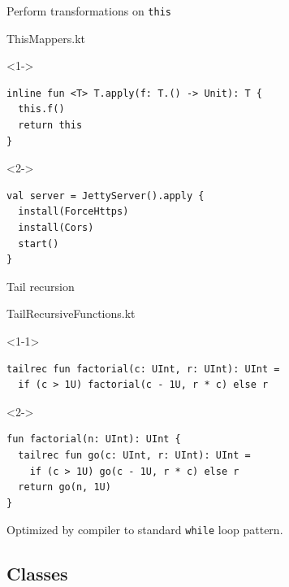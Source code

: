 \documentclass[hyperref={pdfpagelabels=false},xcolor={dvipsnames},compress]{beamer}
\begin{document}
    \begin{frame}[fragile]{Perform transformations on \texttt{this}}
        \begin{exampleblock}{ThisMappers.kt}
            \begin{onlyenv}<1->
                \begin{lstlisting}
inline fun <T> T.apply(f: T.() -> Unit): T {
  this.f()
  return this
}
                \end{lstlisting}
            \end{onlyenv}
            \begin{onlyenv}<2->
                \begin{lstlisting}
val server = JettyServer().apply {
  install(ForceHttps)
  install(Cors)
  start()
}
                \end{lstlisting}
            \end{onlyenv}
        \end{exampleblock}
    \end{frame}

    \begin{frame}[fragile]{Tail recursion}
        \begin{exampleblock}{TailRecursiveFunctions.kt}
            \begin{onlyenv}<1-1>
                \begin{lstlisting}
tailrec fun factorial(c: UInt, r: UInt): UInt =
  if (c > 1U) factorial(c - 1U, r * c) else r
                \end{lstlisting}
            \end{onlyenv}
            \begin{onlyenv}<2->
                \begin{lstlisting}
fun factorial(n: UInt): UInt {
  tailrec fun go(c: UInt, r: UInt): UInt =
    if (c > 1U) go(c - 1U, r * c) else r
  return go(n, 1U)
}
                \end{lstlisting}
            \end{onlyenv}
        \end{exampleblock}
        Optimized by compiler to standard \texttt{while} loop pattern.
    \end{frame}

    \subsection{Classes}
\end{document}
